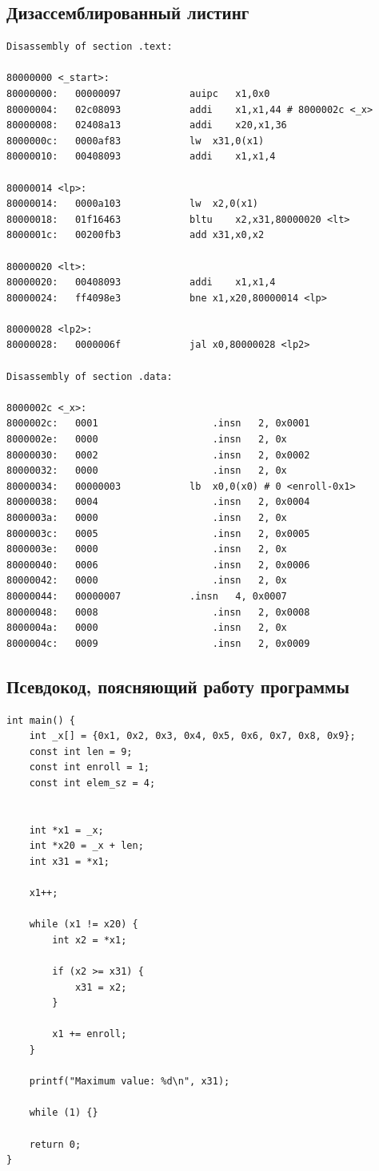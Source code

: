 \documentclass{article}
\begin{document}
\subsection{Дизассемблированный листинг}
\begin{lstlisting}[style=lst, caption=Дизассемблированный листинг программы]
Disassembly of section .text:

80000000 <_start>:
80000000:	00000097          	auipc	x1,0x0
80000004:	02c08093          	addi	x1,x1,44 # 8000002c <_x>
80000008:	02408a13          	addi	x20,x1,36
8000000c:	0000af83          	lw	x31,0(x1)
80000010:	00408093          	addi	x1,x1,4

80000014 <lp>:
80000014:	0000a103          	lw	x2,0(x1)
80000018:	01f16463          	bltu	x2,x31,80000020 <lt>
8000001c:	00200fb3          	add	x31,x0,x2

80000020 <lt>:
80000020:	00408093          	addi	x1,x1,4
80000024:	ff4098e3          	bne	x1,x20,80000014 <lp>

80000028 <lp2>:
80000028:	0000006f          	jal	x0,80000028 <lp2>

Disassembly of section .data:

8000002c <_x>:
8000002c:	0001                	.insn	2, 0x0001
8000002e:	0000                	.insn	2, 0x
80000030:	0002                	.insn	2, 0x0002
80000032:	0000                	.insn	2, 0x
80000034:	00000003          	lb	x0,0(x0) # 0 <enroll-0x1>
80000038:	0004                	.insn	2, 0x0004
8000003a:	0000                	.insn	2, 0x
8000003c:	0005                	.insn	2, 0x0005
8000003e:	0000                	.insn	2, 0x
80000040:	0006                	.insn	2, 0x0006
80000042:	0000                	.insn	2, 0x
80000044:	00000007          	.insn	4, 0x0007
80000048:	0008                	.insn	2, 0x0008
8000004a:	0000                	.insn	2, 0x
8000004c:	0009                	.insn	2, 0x0009
\end{lstlisting}

\subsection{Псевдокод, поясняющий работу программы}
\begin{lstlisting}[style=lst, caption=pcode]
int main() {
    int _x[] = {0x1, 0x2, 0x3, 0x4, 0x5, 0x6, 0x7, 0x8, 0x9};
    const int len = 9;
    const int enroll = 1;
    const int elem_sz = 4;


    int *x1 = _x;
    int *x20 = _x + len;
    int x31 = *x1;

    x1++;

    while (x1 != x20) {
        int x2 = *x1;

        if (x2 >= x31) {
            x31 = x2;
        }

        x1 += enroll;
    }

    printf("Maximum value: %d\n", x31);

    while (1) {}

    return 0;
}
\end{lstlisting}
\end{document}
